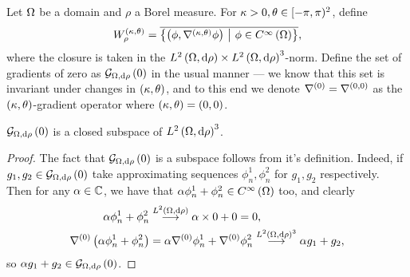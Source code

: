 \documentclass[11pt]{report}
\newcommand{\ograd}{\grad^{(0)}}
\begin{document}
Let $\Omega$ be a domain and $\rho$ a Borel measure.
For $\kappa>0, \theta\in[-\pi,\pi)^2$, define 
\begin{align*}
	W^{\left( \kappa, \theta \right)}_\rho = \overline{ \left\{  \left( \phi, \nabla^{\left( \kappa, \theta \right)}\phi \right) \ \middle\vert \  \phi\in C^{\infty}\left( \Omega \right)  \right\} },
\end{align*}
where the closure is taken in the $L^{2}\left( \Omega,\mathrm{d}\rho \right)\times L^{2}\left( \Omega,\mathrm{d}\rho \right)^3$-norm.
Define the set of gradients of zero as $\mathcal{G}_{ \Omega, \mathrm{d}\rho}\left( 0 \right)$ in the usual manner --- we know that this set is invariant under changes in $\left( \kappa, \theta \right)$, and to this end we denote $\ograd = \grad^{(0,0)}$ as the $\left( \kappa, \theta \right)$-gradient operator where $\left( \kappa, \theta \right)=(0,0)$.

\begin{prop}
	$\mathcal{G}_{ \Omega, \mathrm{d}\rho}\left( 0 \right)$ is a closed subspace of $L^{2}\left( \Omega,\mathrm{d}\rho \right)^3$.
\end{prop}
\begin{proof}
	The fact that $\mathcal{G}_{ \Omega, \mathrm{d}\rho}\left( 0 \right)$ is a subspace follows from it's definition.
	Indeed, if $g_1, g_2\in\mathcal{G}_{ \Omega, \mathrm{d}\rho}\left( 0 \right)$ take approximating sequences $\phi^1_n, \phi^2_n$ for $g_1, g_2$ respectively.
	Then for any $\alpha\in\mathbb{C}$, we have that $\alpha\phi^1_n + \phi^2_n\in C^{\infty}\left( \Omega \right)$ too, and clearly
	\begin{align*}
		\alpha\phi^1_n + \phi^2_n &\lconv{\ltwo{\ddom}{\rho}} \alpha\times 0 + 0 = 0, \\
		\ograd\bracs{\alpha\phi^1_n + \phi^2_n} &= \alpha\ograd\phi^1_n + \ograd\phi^2_n
		\lconv{\ltwo{\ddom}{\rho}^3} \alpha g_1 + g_2,
	\end{align*}
	so $\alpha g_1 + g_2\in\mathcal{G}_{ \Omega, \mathrm{d}\rho}\left( 0 \right)$.
	

\end{proof}
\end{document}
